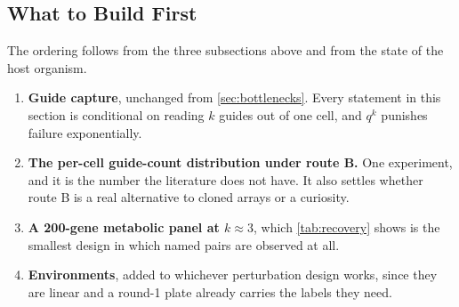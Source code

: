 \subsection{What to Build First}
\label{sec:scaling-order}

The ordering follows from the three subsections above and from the state of the
host organism.

\begin{enumerate}
\item \textbf{Guide capture}, unchanged from \cref{sec:bottlenecks}. Every
  statement in this section is conditional on reading $k$ guides out of one cell,
  and $q^{k}$ punishes failure exponentially.
\item \textbf{The per-cell guide-count distribution under route B.} One
  experiment, and it is the number the literature does not have. It also settles
  whether route B is a real alternative to cloned arrays or a curiosity.
\item \textbf{A 200-gene metabolic panel at $k\approx3$}, which
  \cref{tab:recovery} shows is the smallest design in which named pairs are
  observed at all.
\item \textbf{Environments}, added to whichever perturbation design works, since
  they are linear and a round-1 plate already carries the labels they need.
\end{enumerate}
